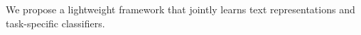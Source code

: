 We propose a lightweight framework that jointly learns text representations and task-specific classifiers.
